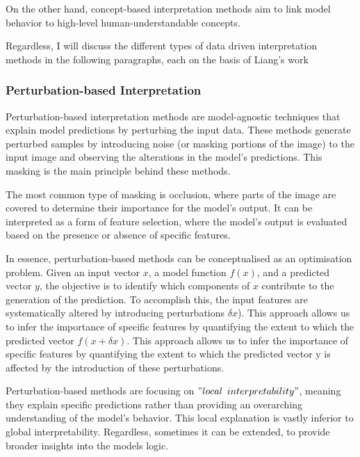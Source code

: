 On the other hand, concept-based interpretation methods aim to link model behavior to high-level human-understandable concepts.

Regardless, I will discuss the different types of data driven interpretation methods in the following paragraphs, each on the basis of Liang's work~\cite{LIANG2021168}

\subsubsection{Perturbation-based Interpretation}\label{subsubsec:pertubation-based-interpretation}

Perturbation-based interpretation methods are model-agnostic techniques that explain model predictions by perturbing the input data.
These methods generate perturbed samples by introducing noise (or masking portions of the image) to the input image and observing the alterations in the model's predictions.
This masking is the main principle behind these methods.

The most common type of masking is occlusion, where parts of the image are covered to determine their importance for the model's output.
It can be interpreted as a form of feature selection, where the model's output is evaluated based on the presence or absence of specific features.

In essence, perturbation-based methods can be conceptualised as an optimisation problem.
Given an input vector \( x \), a model function \( f(x) \), and a predicted vector \( y \),
the objective is to identify which components of \( x \) contribute to the generation of the prediction. To accomplish this, the input features are systematically altered by introducing perturbations \( \delta x \)).
This approach allows us to infer the importance of specific features by quantifying the extent to which the predicted vector  \( f(x + \delta x) \).
This approach allows us to infer the importance of specific features by quantifying the extent to which the predicted vector y is affected by the introduction of these perturbations.



Perturbation-based methods are focusing on \("local\) \(interpretability"\), meaning they explain specific predictions rather than providing an overarching understanding of the model’s behavior.
This local explanation is vastly inferior to global interpretability.
Regardless, sometimes it can be extended, to provide broader insights into the models logic.

